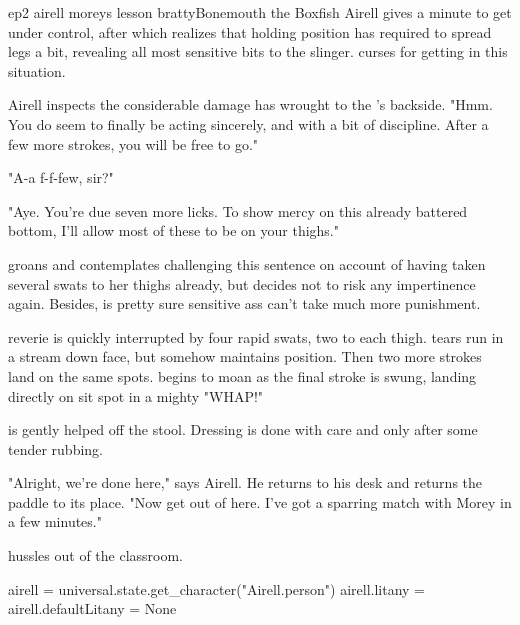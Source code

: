 \documentclass{book}
\begin{document}
\begin{childnode}{ep2 airell moreys lesson bratty}{Bonemouth the Boxfish}
    Airell gives \name{} a minute to get \himselfherself{} under control, after which \heshe{} realizes that holding \hisher{} position has required \himher{} to spread \hisher{} legs a bit,
    revealing all \hisher{} most sensitive bits to the slinger. \HeShe{}
    curses \himselfherself{} for getting \himselfherself{} in this situation.

    Airell inspects the considerable damage \heshe{} has wrought to the \boygirl{}'s \bumadj{} backside. "Hmm. You do seem to finally be acting sincerely, and with a bit of discipline. After a few 
    more strokes, you will be free to go."

"A-a f-f-few, sir?" 

"Aye. You're due seven more licks. To show mercy on this already battered bottom, I'll allow most of these to be on your thighs."

\name{} groans and contemplates challenging this sentence on account of having taken several swats to her thighs already, but decides not to risk any impertinence again. Besides, \heshe{} is 
pretty sure \hisher{} sensitive ass can't take much more punishment.

\HisHer{} reverie is quickly interrupted by four rapid swats, two to each thigh. \names{} tears run in a stream down \hisher{} face, but \heshe{} somehow maintains \hisher{} position. Then two more 
strokes land on the same spots. \HeShe{} begins to moan as the final stroke is swung, landing directly on \hisher{} sit spot in a mighty "WHAP!"

\name{} is gently helped off the stool. Dressing is done with care and only after some tender rubbing. 

"Alright, we're done here," says Airell. He returns to his desk and returns the paddle to its place. "Now get out of here. I've got a sparring match with Morey in a few minutes."

\name{} hussles out of the classroom. 


\begin{code}

    airell = universal.state.get_character("Airell.person")
    airell.litany = airell.defaultLitany = None

\end{code}

\end{childnode}
\end{document}
